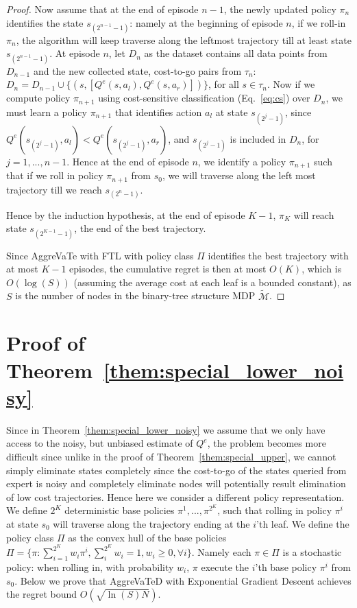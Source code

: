 \documentclass{article}
\begin{document}
\begin{proof}
Now assume that at the end of episode $n-1$, the newly updated policy $\pi_{n}$ identifies the state $s_{(2^{n-1}-1)}$: namely at the beginning of episode $n$, if we roll-in $\pi_n$, the algorithm will keep traverse along the leftmost trajectory till at least state $s_{(2^{n-1}-1)}$. At episode $n$, let $D_n$ as the dataset contains all data points from $D_{n-1}$ and the new collected state, cost-to-go pairs from $\tau_n$: $D_n = D_{n-1}\cup \{(s, [Q^e(s,a_l),Q^e(s,a_r)])\} $, for all $s\in\tau_n$. Now if we compute policy $\pi_{n+1}$ using cost-sensitive classification (Eq.~\ref{eq:cs}) over $D_n$, we must learn a policy $\pi_{n+1}$ that identifies action $a_l$ at state $s_{(2^{j}-1)}$, since $Q^{e}(s_{(2^{j}-1)}, a_l)< Q^e(s_{(2^{j}-1)}, a_r)$, and $s_{(2^j - 1)}$ is included in $D_n$, for $j=1,..., n-1$.  Hence at the end of episode $n$, we identify a policy $\pi_{n+1}$ such that if we roll in policy $\pi_{n+1}$ from $s_0$, we will traverse along the left most trajectory till we reach $s_{(2^n-1)}$.  

Hence by the induction hypothesis, at the end of episode $K-1$, $\pi_{K}$ will reach state $s_{(2^{K-1}-1)}$, the end of the best trajectory.

Since AggreVaTe with FTL with policy class $\Pi$ identifies the best trajectory with at most $K-1$ episodes, the cumulative regret is then at most $O(K)$, which is $O(\log(S))$ (assuming the average cost at each leaf is a bounded constant), as $S$ is the number of nodes in the binary-tree structure MDP $\tilde{\mathcal{M}}$.
\end{proof}


\section{Proof of Theorem~\ref{them:special_lower_noisy}}
\label{sec:proof_special_noisy}
Since in Theorem~\ref{them:special_lower_noisy} we assume that we only have access to the noisy, but unbiased estimate of $Q^e$, the problem becomes more difficult since unlike in the proof of Theorem~\ref{them:special_upper}, we cannot simply eliminate states completely since the cost-to-go of the states queried from expert is noisy and completely eliminate nodes will potentially result elimination of low cost trajectories. Hence here we consider a different policy representation. We define $2^{K}$ deterministic base policies $\pi^1, ..., \pi^{2^K}$, such that rolling in policy $\pi^i$ at state $s_0$ will traverse along the trajectory ending at the $i$'th leaf. We define the policy class $\Pi$ as the convex hull of the base policies $\Pi = \{\pi: \sum_{i=1}^{2^K}w_i\pi^i, \sum_i^{2^K}w_i = 1, w_i\geq 0, \forall i\}$. Namely each $\pi\in\Pi$ is a stochastic policy: when rolling in, with probability $w_i$, $\pi$ execute the $i$'th base policy $\pi^i$ from $s_0$. Below we prove that AggreVaTeD with Exponential Gradient Descent achieves the regret bound $O(\sqrt{\ln(S) N})$.
\end{document}
